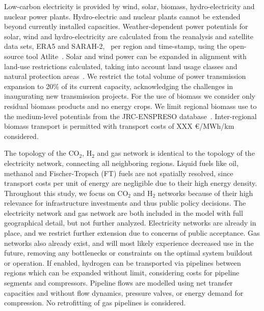 \documentclass[twocolumn]{article}
\newcommand{\COtwo}{CO$_2$}
\newcommand{\Htwo}{H$_2$}
\begin{document}

Low-carbon electricity is provided by wind, solar, biomass, hydro-electricity and nuclear power plants. Hydro-electric and nuclear plants cannot be extended beyond currently installed capacities. Weather-dependent power potentials for solar, wind and hydro-electricity are calculated from the reanalysis and satellite data sets, ERA5 and SARAH-2,~\cite{hersbachERA5GlobalReanalysis2020,pfeifrothSurfaceRadiationData2017} per region and time-stamp, using the open-source tool Atlite~\cite{hofmannAtliteLightweightPython2021}.
Solar and wind power can be expanded in alignment with land-use restrictions calculated, taking into account land usage classes and natural protection areas~\cite{eeaCorineLandCover2012,eeaNatura2000Data2016}. We restrict the total volume of power transmission expansion to 20\% of its current capacity, acknowledging the challenges in inaugurating new transmission projects.
For the use of biomass we consider only residual biomass products and no energy crops. We limit regional biomass use to the medium-level potentials from the JRC-ENSPRESO database~\cite{enspreso_database,instituteforenergyandtransportjointresearchcentreJRCEUTIMESModelBioenergy2015}. Inter-regional biomass transport is permitted with transport costs of XXX €/MWh/km considered.


The topology of the \COtwo{}, \Htwo{} and gas network is identical to the topology of the electricity network, connecting all neighboring regions. Liquid fuels like oil, methanol and Fischer-Tropsch (FT) fuels are not spatially resolved, since transport costs per unit of energy are negligible due to their high energy density. Throughout this study, we focus on \COtwo{} and \Htwo{} networks because of their high relevance for infrastructure investments and thus public policy decisions. The electricity network and gas network are both included in the model with full geographical detail, but not further analyzed. Electricity networks are already in place, and we restrict further extension due to concerns of public acceptance. Gas networks also already exist, and will most likely experience decreased use in the future, removing any bottlenecks or constraints on the optimal system buildout or operation.
If enabled, hydrogen can be transported via pipelines between regions which can be expanded without limit, considering costs for pipeline segments and compressors. Pipeline flows are modelled using net transfer capacities and without flow dynamics, pressure valves, or energy demand for compression. No retrofitting of gas pipelines is considered.
\end{document}
